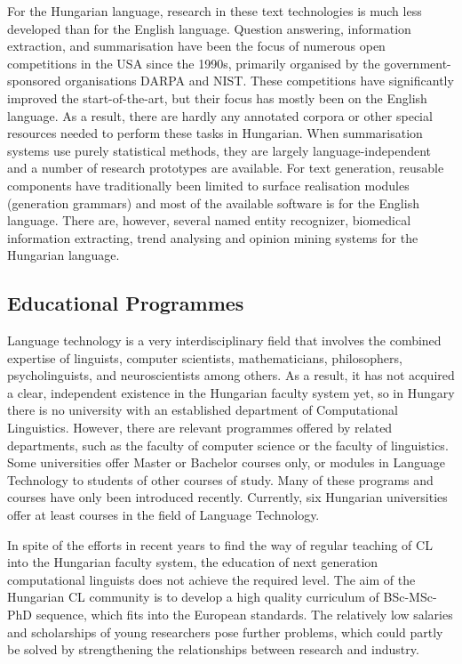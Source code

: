 \begin{multicols}{2}
For the Hungarian language, research in these text technologies is much less developed than for the English language. Question answering, information extraction, and summarisation have been the focus of numerous open competitions in the USA since the 1990s, primarily organised by the government-sponsored organisations DARPA and NIST. These competitions have significantly improved the start-of-the-art, but their focus has mostly been on the English language. As a result, there are hardly any annotated corpora or other special resources needed to perform these tasks in Hungarian. When summarisation systems use purely statistical methods, they are largely language-independent and a number of research prototypes are available. For text generation, reusable components have traditionally been limited to surface realisation modules (generation grammars) and most of the available software is for the English language. There are, however, several named entity recognizer, biomedical information extracting, trend analysing and opinion mining systems for the Hungarian language.

\subsection{Educational Programmes}

Language technology is a very interdisciplinary field that involves the combined expertise of linguists, computer scientists, mathematicians, philosophers, psycholinguists, and neuroscientists among others. As a result, it has not acquired a clear, independent existence in the Hungarian faculty system yet, so in Hungary there is no university with an established department of Computational Linguistics. However, there are relevant programmes offered by related departments, such as the faculty of computer science or the faculty of linguistics. Some universities offer Master or Bachelor courses only, or modules in Language Technology to students of other courses of study. Many of these programs and courses have only been introduced recently. Currently, six Hungarian universities offer at least courses in the field of Language Technology.

In spite of the efforts in recent years to find the way of regular teaching of CL into the Hungarian faculty system, the education of next generation computational linguists does not achieve the required level. The aim of the Hungarian CL community is to develop a high quality curriculum of BSc-MSc-PhD sequence, which fits into the European standards. The relatively low salaries and scholarships of young researchers pose further problems, which could partly be solved by strengthening the relationships between research and industry.


\end{multicols}
